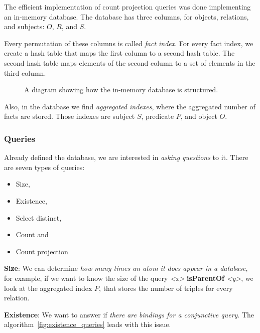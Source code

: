 \documentclass{article}
\newcommand{\triple}[3]{{\itshape\textless#1\textgreater} {\bfseries#2} {\itshape\textless#3\textgreater}}
\begin{document}
The efficient implementation of count projection queries was done implementing
an in-memory database. The database has three columns, for objects, relations,
and subjects: $O$, $R$, and $S$.

Every permutation of these columns is called \textit{fact index}. For every
fact index, we create a hash table that maps the first column to a second hash
table. The second hash table maps elements of the second column to a set of
elements in the third column.

\begin{figure}[H]
\centering
    
\caption{A diagram showing how the in-memory database is structured.}
\label{fig:db}
\end{figure}

Also, in the database we find \textit{aggregated indexes}, where the aggregated
number of facts are stored. Those indexes are subject $S$, predicate $P$, and object $O$.

\subsubsection{Queries}
\label{sssec:queries}

Already defined the database, we are interested in \textit{asking questions} to
it. There are seven types of queries:

\begin{itemize}
    \item Size,
    \item Existence,
    \item Select distinct,
    \item Count and
    \item Count projection
\end{itemize}

\noindent \textbf{Size}: We can determine \textit{how many times an
atom it does appear in a database}, for example, if we want to know the size of
the query \triple{x}{isParentOf}{y}, we look at the aggregated index $P$, that
stores the number of triples for every relation.

\noindent \textbf{Existence}: We want to answer if \textit{there are bindings
for a conjunctive query}. The algorithm~\ref{fig:existence_queries} leads with
this issue.
\end{document}
